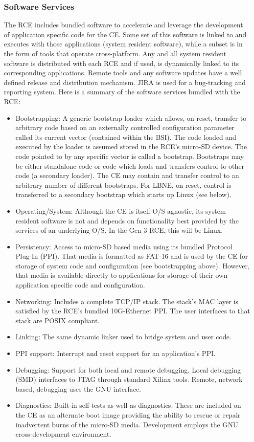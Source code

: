 \subsubsection{Software Services}
\label{sec:Services}
The RCE includes bundled software to accelerate and leverage 
the development of application specific code for the CE. 
Some set of this software is linked to and executes with those 
applications (system resident software), while a subset is in the 
form of tools that operate cross-platform. 
Any and all system resident software is distributed with each RCE 
and if used, is dynamically linked to its corresponding applications. 
Remote tools and any software updates have a well defined release and
distribution mechanism. 
JIRA is used for a bug-tracking and reporting system. 
Here is a summary of the software services bundled with the RCE:
\begin{itemize}
\item Bootstrapping: A generic bootstrap loader which allows, on reset,
transfer to arbitrary code based on an externally controlled configuration 
parameter called its current vector (contained within the BSI). 
The code loaded and executed by the loader is assumed stored in the RCE's 
micro-SD device. The code pointed to by any specific vector is called a bootstrap. 
Bootstraps may be either standalone code or
code which loads and transfers control to other code (a secondary loader). 
The CE may contain and transfer control to an arbitrary number of different 
bootstraps. 
For LBNE, on reset, control is transferred to a secondary bootstrap 
which starts up Linux (see below).
\item Operating/System: 
Although the CE is itself O/S agnostic, its system resident software is 
not and depends on functionality best provided by the services of an underlying O/S.
In the Gen 3 RCE, this will be Linux.
\item Persistency:
Access to micro-SD based media using its bundled Protocol
Plug-In (PPI). 
That media is formatted as FAT-16 and is used by the CE 
for storage of system code and configuration (see bootstrapping above). 
However, that media is available directly to applications 
for storage of their own application specific code and configuration.
\item Networking: Includes a complete TCP/IP stack. 
The stack's MAC layer is satisfied by the RCE's bundled 10G-Ethernet PPI. 
The user interfaces to that stack are POSIX compliant.
\item Linking: The same dynamic linker used to bridge system and user code.
\item PPI support: Interrupt and reset support for an application's PPI.
\item Debugging: Support for both local and remote debugging. 
Local debugging (SMD) interfaces to JTAG through standard Xilinx tools. 
Remote, network based, debugging uses the GNU interface.
\item Diagnostics: Built-in self-tests as well as diagnostics. 
These are included on the CE as an alternate boot image providing the 
ability to rescue or repair inadvertent burns of the micro-SD media.  
Development employs the GNU cross-development environment.
\end{itemize}

